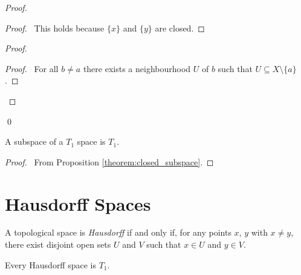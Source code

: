 \begin{proof}
    \pf
    \begin{proof}
        \pf\ This holds because $\{x\}$ and $\{y\}$ are closed.
    \end{proof}
    \begin{proof}
        \begin{proof}
            \pf\ For all $b \neq a$ there exists a neighbourhood $U$ of $b$ such that $U \subseteq X \setminus \{a\}$.
        \end{proof}
    \end{proof}
    \qed
\end{proof}

\begin{proposition}
    \label{proposition:T1_subspace}
    A subspace of a $T_1$ space is $T_1$.
\end{proposition}

\begin{proof}
    \pf\ From Proposition \ref{theorem:closed_subspace}.
\end{proof}

\section{Hausdorff Spaces}

\begin{definition}
    A topological space is \emph{Hausdorff} if and only if, for any points $x$, $y$ with $x \neq y$,
    there exist disjoint open sets $U$ and $V$ such that $x \in U$ and $y \in V$.
\end{definition}

\begin{theorem}
    Every Hausdorff space is $T_1$.
\end{theorem}

